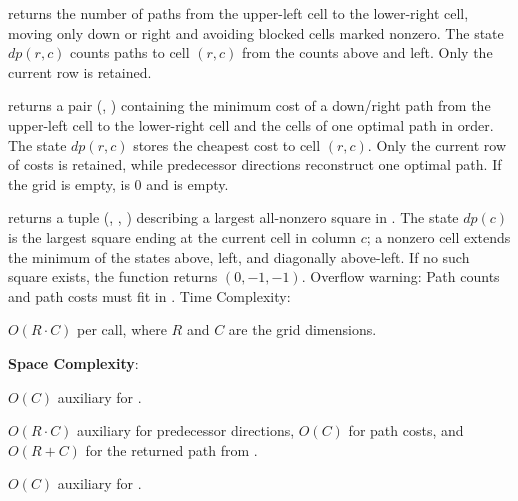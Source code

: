 \begin{compactitem}
  \item {} returns the number of paths from the upper-left cell to the lower-right cell, moving only down or right and avoiding blocked cells marked nonzero. The state $dp(r, c)$ counts paths to cell $(r, c)$ from the counts above and left. Only the current row is retained.
  \item {} returns a pair (, ) containing the minimum cost of a down/right path from the upper-left cell to the lower-right cell and the cells of one optimal path in order. The state $dp(r, c)$ stores the cheapest cost to cell $(r, c)$. Only the current row of costs is retained, while predecessor directions reconstruct one optimal path. If the grid is empty,  is $0$ and  is empty.
  \item {} returns a tuple (, , ) describing a largest all-nonzero square in . The state $dp(c)$ is the largest square ending at the current cell in column $c$; a nonzero cell extends the minimum of the states above, left, and diagonally above-left. If no such square exists, the function returns $(0, -1, -1)$. Overflow warning: Path counts and path costs must fit in . Time Complexity:
  \item $O(R \cdot C)$ per call, where $R$ and $C$ are the grid dimensions.
\end{compactitem}

\textbf{Space Complexity}:
\begin{compactitem}
  \item $O(C)$ auxiliary for .
  \item $O(R \cdot C)$ auxiliary for predecessor directions, $O(C)$ for path costs, and $O(R + C)$ for the returned path from .
  \item $O(C)$ auxiliary for .
\end{compactitem}

